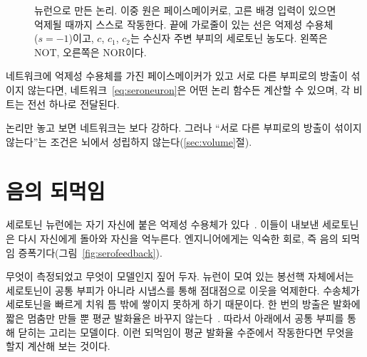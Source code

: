 \begin{figure}[t]
\centering
{}
\caption{ 뉴런으로 만든 논리. 이중 원은 페이스메이커로, 고른 배경 입력이 있으면 억제될 때까지 스스로 작동한다. 끝에 가로줄이 있는 선은 억제성 수용체($s=-1$)이고, $c$, $c_1$, $c_2$는 수신자 주변 부피의 세로토닌 농도다. 왼쪽은 NOT, 오른쪽은 NOR이다.}
\label{fig:serogates}
\end{figure}

\begin{keyblock}
\begin{proposition}
\label{prop:serocomplete}
네트워크에 억제성 수용체를 가진 페이스메이커가 있고 서로 다른 부피로의 방출이 섞이지 않는다면, 네트워크~\eqref{eq:seroneuron}은 어떤 논리 함수든 계산할 수 있으며, 각 비트는 전선 하나로 전달된다.
\end{proposition}
\end{keyblock}

논리만 놓고 보면  네트워크는 보다 강하다. 그러나 “서로 다른 부피로의 방출이 섞이지 않는다”는 조건은 뇌에서 성립하지 않는다(\ref{sec:volume}절).

\section{음의 되먹임}

세로토닌 뉴런에는 자기 자신에 붙은 억제성 수용체가 있다~\cite{Sprouse1987}. 이들이 내보낸 세로토닌은 다시 자신에게 돌아와 자신을 억누른다. 엔지니어에게는 익숙한 회로, 즉 음의 되먹임 증폭기다(그림~\ref{fig:serofeedback}).

무엇이 측정되었고 무엇이 모델인지 짚어 두자.  뉴런이 모여 있는 봉선핵 자체에서는 세로토닌이 공통 부피가 아니라 시냅스를 통해 점대점으로 이웃을 억제한다. 수송체가 세로토닌을 빠르게 치워 틈 밖에 쌓이지 못하게 하기 때문이다. 한 번의 방출은 발화에 짧은 멈춤만 만들 뿐 평균 발화율은 바꾸지 않는다~\cite{CourtneyFord2016}. 따라서 아래에서 공통 부피를 통해 닫히는 고리는 모델이다. 이런 되먹임이 평균 발화율 수준에서 작동한다면 무엇을 할지 계산해 보는 것이다.

